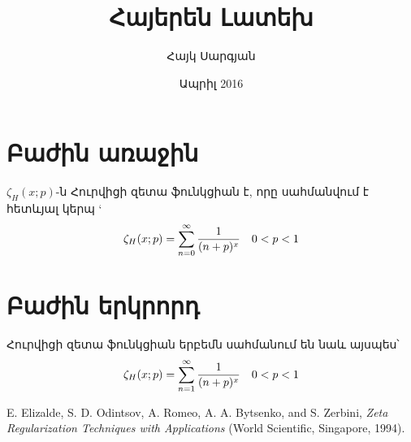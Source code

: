 \documentclass[a4paper]{article}
\title{Հայերեն Լատեխ}
\author{Հայկ Սարգյան}
\date{Ապրիլ 2016}
\begin{document}
\maketitle
\tableofcontents

\section{Բաժին առաջին}
\(\zeta_H(x;p)\)-ն Հուրվիցի զետա ֆունկցիան է, որը սահմանվում է հետևյալ կերպ \cite{book:elizalde_zeta}`
%
\begin{equation}
\zeta_H(x;p)=\sum_{n=0}^{\infty}\frac{1}{(n+p)^x} \quad 0<p<1 \\
\end{equation}
%
%
\section{Բաժին երկրորդ}
%
Հուրվիցի զետա ֆունկցիան երբեմն սահմանում են նաև այսպես՝
%
\begin{equation}
\zeta_H(x;p)=\sum_{n=1}^{\infty}\frac{1}{(n+p)^x} \quad 0<p<1 \\
\end{equation}
%

\begin{thebibliography}{1}
 E. Elizalde, S. D. Odintsov, A. Romeo, A. A. Bytsenko, and S. Zerbini, \emph{Zeta Regularization Techniques with Applications} (World Scientific, Singapore, 1994).


\end{thebibliography}
\end{document}
